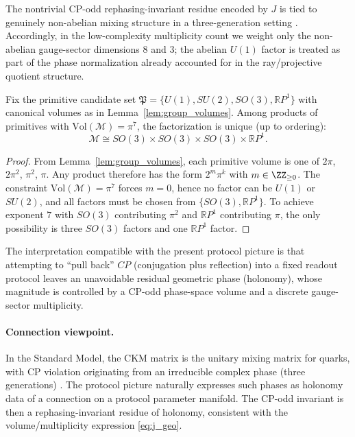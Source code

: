 \begin{remark}\label{rem:dcp_excludes_u1}
The nontrivial CP-odd rephasing-invariant residue encoded by $J$ is tied to genuinely non-abelian mixing structure in a three-generation setting \cite{Jarlskog1985,PDGRPP2024}.
Accordingly, in the low-complexity multiplicity count we weight only the non-abelian gauge-sector dimensions $8$ and $3$; the abelian $U(1)$ factor is treated as part of the phase normalization already accounted for in the ray/projective quotient structure.
\end{remark}
\begin{proposition}\label{prop:cp_phase_factorization_rigidity}
Fix the primitive candidate set $\mathfrak{P}=\{U(1),SU(2),SO(3),\mathbb{R}P^1\}$ with canonical volumes as in Lemma~\ref{lem:group_volumes}.
Among products of primitives with $\mathrm{Vol}(\mathcal{M})=\pi^7$, the factorization is unique (up to ordering):
\[
\mathcal{M}\cong SO(3)\times SO(3)\times SO(3)\times \mathbb{R}P^1.
\]
\end{proposition}
\begin{proof}
From Lemma~\ref{lem:group_volumes}, each primitive volume is one of $2\pi$, $2\pi^2$, $\pi^2$, $\pi$.
Any product therefore has the form $2^m\pi^k$ with $m\in\ZZ_{\ge 0}$.
The constraint $\mathrm{Vol}(\mathcal{M})=\pi^7$ forces $m=0$, hence no factor can be $U(1)$ or $SU(2)$, and all factors must be chosen from $\{SO(3),\mathbb{R}P^1\}$.
To achieve exponent $7$ with $SO(3)$ contributing $\pi^2$ and $\mathbb{R}P^1$ contributing $\pi$, the only possibility is three $SO(3)$ factors and one $\mathbb{R}P^1$ factor.
\end{proof}
The interpretation compatible with the present protocol picture is that attempting to ``pull back'' $CP$ (conjugation plus reflection) into a fixed readout protocol leaves an unavoidable residual geometric phase (holonomy), whose magnitude is controlled by a CP-odd phase-space volume and a discrete gauge-sector multiplicity.
\paragraph{Connection viewpoint.}
In the Standard Model, the CKM matrix is the unitary mixing matrix for quarks, with CP violation originating from an irreducible complex phase (three generations) \cite{Cabibbo1963,KobayashiMaskawa1973,PDGRPP2024}.
The protocol picture naturally expresses such phases as holonomy data of a connection on a protocol parameter manifold.
The CP-odd invariant is then a rephasing-invariant residue of holonomy, consistent with the volume/multiplicity expression \eqref{eq:j_geo}.

